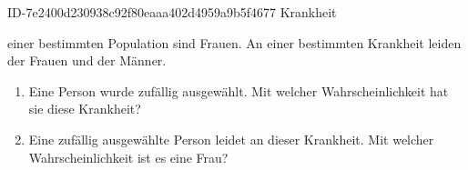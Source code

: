 \begin{exercise}
      {ID-7e2400d230938c92f80eaaa402d4959a9b5f4677}
      {Krankheit}
  \ifproblem\problem\par
     einer bestimmten Population sind Frauen. An einer bestimmten Krankheit
    leiden  der Frauen und  der Männer.
    \begin{enumerate}
      \item Eine Person wurde zufällig ausgewählt. Mit welcher Wahrscheinlichkeit
            hat sie diese Krankheit?
      \item Eine zufällig ausgewählte Person leidet an dieser Krankheit.
            Mit welcher Wahrscheinlichkeit ist es eine Frau?
    \end{enumerate}
  \fi
\end{exercise}
